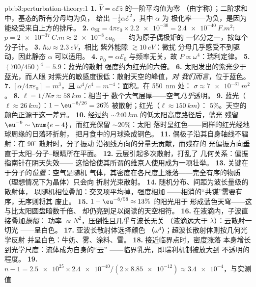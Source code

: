 \begin{solution}{pb:b3:perturbation-theory:1}
\textbf{1.} $\hat V = e\mathcal E\hat z$ 的一阶平均值为零
（由宇称）；二阶求和中，基态的所有分母均为负，
给出 $-\tfrac12\alpha\mathcal E^2$，其中 $\alpha$ 为
极化率——为负，是因为能级受来自上方的排斥。
\textbf{2.} $\alpha_{\text{SI}} = 4\pi\varepsilon_0 \times
\num{2.2e-30} = \qty{2.4e-40}{F.m^2}$: $p = \qty{2e-37}{C.m}
\approx \num{2e-8}\,ea_0$——约为原子偶极矩的
一亿分之一，按每个分子计。
\textbf{3.} $\hbar\omega \approx \qty{2.3}{eV}$，相比
紫外能隙 $\gtrsim\qty{10}{eV}$：微扰
分母几乎感受不到驱动，因此静态 $\alpha$
可以适用。
\textbf{4.} $p_0 = \alpha\mathcal E_0$ 与频率无关，故 $P
\propto \omega^4$：瑞利定律。
\textbf{5.} $(700/450)^4 = 5.9$：蓝光的散射
强度约为红光的六倍。
\textbf{6.} 太阳发出的紫光少于蓝光，而人眼
对紫光的敏感度很低：散射天空的峰值，\emph{对
我们而言}，位于蓝色。
\textbf{7.} $[\alpha/4\pi\varepsilon_0] = \unit{m^3}$，且
$\omega^4/c^4 = \unit{m^{-4}}$：面积。在 \qty{550}{nm} 处：
$\sigma \approx \qty{7e-31}{m^2}$。
\textbf{8.} $\ell = 1/N\sigma \approx \qty{58}{km}$：相当于
数个大气层厚——空气\emph{几乎}透明。
\textbf{9.} 蓝光（$\ell \approx \qty{26}{km}$）：$1 -
\eu^{-8/26} = 26\%$ 被散射；红光（$\ell \approx \qty{150}{km}$）：
$5\%$。天空的颜色正源于这一差异。
\textbf{10.} 经过约 $\sim\qty{240}{km}$ 的低太阳高度路径后，蓝光
残留 $\eu^{-9} \sim \num{e-4}$，而红光保留 $\sim20\%$：太阳
落时呈红色——同样的红光经地球周缘的日落环折射，
把月食中的月球染成铜色。
\textbf{11.} 偶极子沿其自身轴线不辐射：在
$90^\circ$ 散射时，分子振动
沿视线方向的分量无贡献，而残存的
光偏振方向垂直于太阳–分子–眼睛所在平面。
\textbf{12.} 云层引起多次散射，打乱了
几何关系：偏振指南针在阴天失效——
这恰恰使其所谓的维京人使用成为一项壮举。
\textbf{13.} 关键在于分子的\emph{位置}：空气是随机
气体，其密度在各尺度上涨落——完全有序的物质
（理想情况下为晶体）只会向
折射光束散射。
\textbf{14.} 随机分布、间距为波长量级的散射体，
以随机相位叠加：交叉项平均掉，强度相加
——相消的“共谋”需要有序，无序则将其
废止。
\textbf{15.} $1 - \eu^{-8/58} \approx 13\%$ 的阳光用于
形成蓝色天穹——这与比太阳圆盘暗数千倍、
却仍亮到足以阅读的天空相符。
\textbf{16.} 在液滴内，子波直接叠加\emph{振幅}：
功率 $\propto N^2$，压倒性且几乎与波长无关
（液滴远大于 $\lambda$）：云散射一切光
——呈白色。
\textbf{17.} 亚波长散射体选择颜色
（$\omega^4$）；超波长散射体则按几何光学反射
并呈白色：牛奶、雾、涂料、雪。
\textbf{18.} 接近临界点时，密度涨落
本身增长到光学尺度：流体成为自身的“云”
——临界乳光，即瑞利机制被放大到
不透明的程度。
\textbf{19.} $n - 1 = \num{2.5e25} \times \num{2.4e-40}/(2 \times
\num{8.85e-12}) \approx \num{3.4e-4}$，与实测值

\end{solution}
